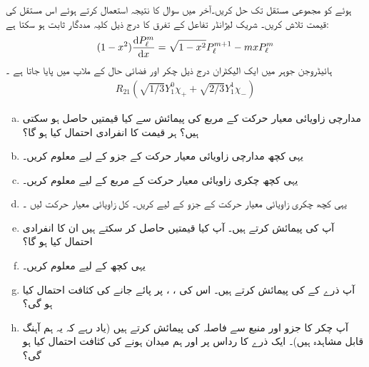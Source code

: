  ہوئے  کو مجموعی مستقل  تک حل کریں۔آخر میں سوال    کا نتیجہ استعمال کرتے ہوئے اس مستقل کی قیمت تلاش کریں۔ شریک لیژانڈر تفاعل کے تفرق کا درج ذیل کلیہ مددگار ثابت ہو سکتا ہے:
\begin{align}
    (1-x^{2})\frac{ \dif  P_{\ell}^{m}} {\dif x}=\sqrt{1-x^{2}}  P_{\ell}^{m+1}-mxP_{\ell}^{m}
\end{align}
ہائیڈروجن جوہر میں ایک الیکٹران درج ذیل چکر اور فضائی حال کے ملاپ میں پایا جاتا ہے ۔
\begin{align*}
    R_{21}(\sqrt{1/3}Y_{1}^{0}\chi_+ + \sqrt{2/3}Y_{1}^{1}\chi_-)
\end{align*} 
\begin{enumerate}[a.]
\item
 مدارچی زاویائی معیار حرکت کے مربع  کی پیمائش سے کیا قیمتیں حاصل ہو سکتی ہیں؟ ہر قیمت کا انفرادی احتمال کیا ہو گا؟ 
\item 
یہی کچھ مدارچی  زاویائی معیار حرکت کے    جزو  کے لیے معلوم کریں۔
\item 
یہی کچھ چکری زاویائی معیار حرکت کے مربع   کے لیے معلوم کریں۔
\item
 یہی کچھ چکری زاویائی معیار حرکت  کے   جزو   کے لیے کریں۔ کل زاویائی معیار حرکت     لیں ۔
\item
 آپ  کی پیمائش کرتے ہیں۔  آپ کیا قیمتیں حاصل کر سکتے ہیں ان کا انفرادی احتمال کیا ہو گا؟
\item
 یہی کچھ  کے لیے معلوم کریں۔
\item
  آپ ذرے کے   کی پیمائش کرتے ہیں۔ اس کی ،  ،    پر پائے جانے کی کثافت احتمال کیا ہو گی؟ 
\item
 آپ چکر کا  جزو  اور منبع سے فاصلہ کی پیمائش کرتے ہیں (یاد رہے کہ یہ ہم آہنگ قابل مشاہدہ  ہیں)۔ ایک ذرے کا رداس   پر اور ہم میدان ہونے کی کثافت احتمال کیا ہو گی؟ 
\end{enumerate}
